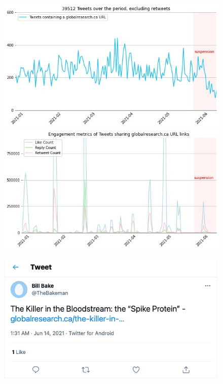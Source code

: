 \documentclass[11pt,a4paper]{article}
\begin{document}
\begin{figure}
\centering
	\begin{multicols}{2}
		\includegraphics[scale=0.2]{./img/globalresearch/sum_globalresearch.ca_6_months.jpg} 
		\includegraphics[scale=0.2]{./img/globalresearch/engagement_sum_rolling_1_globalresearch.ca.jpg}
	\end{multicols}
	\begin{multicols}{2}
		\includegraphics[scale=0.2]{./img/globalresearch/tweet.png} 

\end{multicols}
\end{figure}
\end{document}
